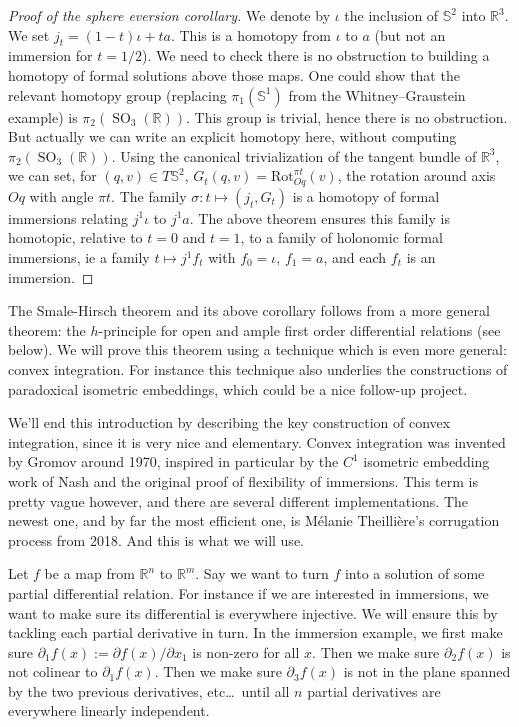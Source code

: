 \documentclass[10pt,a4paper]{article}
\newcommand{\co}{\!:}
\DeclareMathOperator{\SO}{SO}
\begin{document}
\begin{proof}[Proof of the sphere eversion corollary]
	We denote by $ι$ the inclusion of $𝕊^2$ into $ℝ^3$.
	We set $j_t = (1-t)ι	+ ta$. This is a homotopy from $ι$ to $a$ (but not an
	immersion for $t=1/2$).
  We need to check there is no obstruction to building a homotopy of formal
  solutions above those maps. One could show that the relevant homotopy group
  (replacing $π_1(𝕊^1)$ from the Whitney--Graustein example) is
  $\pi_2(\SO_3(ℝ))$. This group is trivial, hence there is no obstruction. But
  actually we can write an explicit homotopy here, without computing
  $\pi_2(\SO_3(ℝ))$.  Using the canonical trivialization of the tangent
	bundle of $ℝ^3$, we can set, for $(q, v) ∈ T𝕊^2$,
	$G_t(q, v) = \mathrm{Rot}_{Oq}^{πt}(v)$, the rotation around axis $Oq$ with
	angle $πt$. The family $σ \co t ↦ (j_t, G_t)$ is a homotopy of formal immersions
	relating $j^1ι$ to $j^1a$. The above theorem ensures this family is homotopic,
	relative to $t = 0$ and $t = 1$, to a family of holonomic formal immersions,
	ie a family $t ↦ j^1f_t$ with $f_0 = ι$, $f_1 = a$, and each $f_t$ is an
	immersion.
\end{proof}

The Smale-Hirsch theorem and its above corollary follows from a more general theorem:
the $h$-principle for open and ample first order differential relations (see
below). We will prove this theorem using a technique which is even more
general: convex integration. For instance this technique also underlies the
constructions of paradoxical isometric embeddings, which could be a nice
follow-up project.

We'll end this introduction by describing the key construction of convex
integration, since it is very nice and elementary. Convex integration
was invented by Gromov around 1970, inspired in particular by the
$C^1$ isometric embedding work of Nash and the original proof of
flexibility of immersions. This term is pretty vague however, and there
are several different implementations. The newest one, and by far the
most efficient one, is Mélanie Theillière's corrugation process from
2018. And this is what we will use.

Let $f$ be a map from $ℝ^n$ to $ℝ^m$. Say we want to turn $f$ into a
solution of some partial differential relation. For instance if we are
interested in immersions, we want to make sure its differential is everywhere
injective. We will ensure this by tackling each partial derivative in turn. In
the immersion example, we first make sure $∂_1f(x) := ∂f(x)/∂x_1$ is non-zero
for all $x$. Then we make sure $∂_2f(x)$ is not colinear to $∂_1f(x)$. Then we
make sure $∂_3f(x)$ is not in the plane spanned by the two previous
derivatives, etc\dots\ until all $n$ partial derivatives are everywhere
linearly independent.
\end{document}

